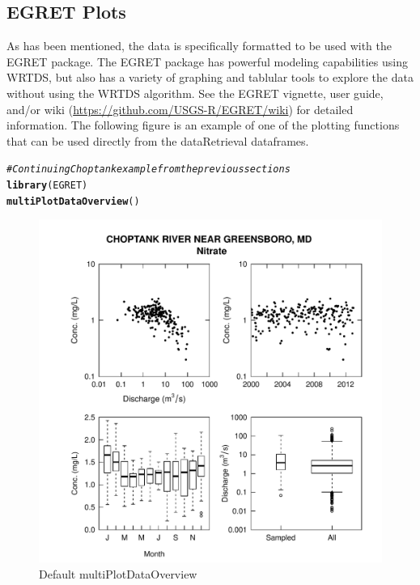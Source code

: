 \documentclass[a4paper,11pt]{article}\usepackage[]{graphicx}\usepackage[]{color}
\makeatletter
\def\maxwidth{ %
  \ifdim\Gin@nat@width>\linewidth
    \linewidth
  \else
    \Gin@nat@width
  \fi
}
\newcommand{\hlcom}[1]{\textcolor[rgb]{0.678,0.584,0.686}{\textit{#1}}}%
\newcommand{\hlstd}[1]{\textcolor[rgb]{0.345,0.345,0.345}{#1}}%
\newcommand{\hlkwd}[1]{\textcolor[rgb]{0.737,0.353,0.396}{\textbf{#1}}}%
\newenvironment{kframe}{%
 \def\at@end@of@kframe{}%
 \ifinner\ifhmode%
  \def\at@end@of@kframe{\end{minipage}}%
  \begin{minipage}{\columnwidth}%
 \fi\fi%
 \def\FrameCommand##1{\hskip\@totalleftmargin \hskip-\fboxsep
 \colorbox{shadecolor}{##1}\hskip-\fboxsep
     \hskip-\linewidth \hskip-\@totalleftmargin \hskip\columnwidth}%
 \MakeFramed {\advance\hsize-\width
   \@totalleftmargin\z@ \linewidth\hsize
   \@setminipage}}%
 {\par\unskip\endMakeFramed%
 \at@end@of@kframe}
\newenvironment{knitrout}{}{} %
\makeatother
\begin{document}
\FloatBarrier

\subsection{EGRET Plots}
As has been mentioned, the data is specifically formatted to be used with the EGRET package. The EGRET package has powerful modeling capabilities using WRTDS, but also has a variety of graphing and tablular tools to explore the data without using the WRTDS algorithm. See the EGRET vignette, user guide, and/or wiki (\url{https://github.com/USGS-R/EGRET/wiki}) for detailed information. The following figure is an example of one of the plotting functions that can be used directly from the dataRetrieval dataframes.

\begin{knitrout}
\color{fgcolor}\begin{kframe}
\begin{alltt}
\hlcom{# Continuing Choptank example from the previous sections}
\hlkwd{library}\hlstd{(EGRET)}
\hlkwd{multiPlotDataOverview}\hlstd{()}
\end{alltt}
\end{kframe}\begin{figure}[]

\includegraphics[width=\maxwidth]{figure/egretEx} \caption[Default multiPlotDataOverview]{Default multiPlotDataOverview\label{fig:egretEx}}
\end{figure}


\end{knitrout}
\end{document}
